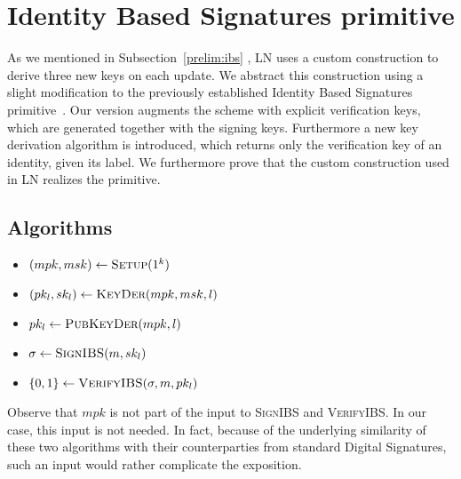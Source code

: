 \section{Identity Based Signatures primitive}
  As we mentioned in Subsection~\ref{prelim:ibs} , LN uses a custom construction to derive three new keys on each
  update. We abstract this construction using a slight modification to the
  previously established Identity Based Signatures
  primitive~\cite{ibspaterson,ibsshamir}. Our version augments the scheme with
  explicit verification keys, which are generated together with the signing
  keys. Furthermore a new key derivation algorithm is introduced, which returns
  only the verification key of an identity, given its label. We furthermore
  prove that the custom construction used in LN realizes the primitive.

  \subsection{Algorithms}
    \begin{itemize}
      \item $(mpk, msk) \leftarrow \textsc{Setup}(1^k)$
      \item $(pk_l, sk_l) \leftarrow \textsc{KeyDer}(mpk, msk, l)$
      \item $pk_l \leftarrow \textsc{PubKeyDer}(mpk, l)$
      \item $\sigma \leftarrow \textsc{SignIBS}(m, sk_l)$
      \item $\{0, 1\} \leftarrow \textsc{VerifyIBS}(\sigma, m, pk_l)$
    \end{itemize}
    Observe that $mpk$ is not part of the input to \textsc{SignIBS} and
    \textsc{VerifyIBS}. In our case, this input is not needed. In fact, because
    of the underlying similarity of these two algorithms with their
    counterparties from standard Digital Signatures, such an input would rather
    complicate the exposition. 

